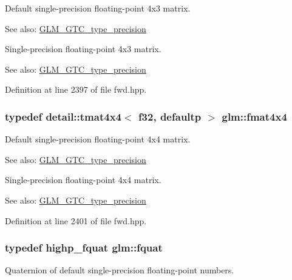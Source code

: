 Default single-precision floating-point 4x3 matrix. \begin{Desc}
\item[See also:]\hyperlink{group__gtc__type__precision}{GLM\_\-GTC\_\-type\_\-precision}\end{Desc}
Single-precision floating-point 4x3 matrix. \begin{Desc}
\item[See also:]\hyperlink{group__gtc__type__precision}{GLM\_\-GTC\_\-type\_\-precision} \end{Desc}


Definition at line 2397 of file fwd.hpp.\hypertarget{group__gtc__type__precision_ga641dae0fcc277f028b4e48e16bbea86}{
\subsubsection[fmat4x4]{\setlength{\rightskip}{0pt plus 5cm}typedef detail::tmat4x4$<$ f32, defaultp $>$ {\bf glm::fmat4x4}}}
\label{group__gtc__type__precision_ga641dae0fcc277f028b4e48e16bbea86}


Default single-precision floating-point 4x4 matrix. \begin{Desc}
\item[See also:]\hyperlink{group__gtc__type__precision}{GLM\_\-GTC\_\-type\_\-precision}\end{Desc}
Single-precision floating-point 4x4 matrix. \begin{Desc}
\item[See also:]\hyperlink{group__gtc__type__precision}{GLM\_\-GTC\_\-type\_\-precision} \end{Desc}


Definition at line 2401 of file fwd.hpp.\hypertarget{group__gtc__type__precision_ga95d73f08018f3864c6ae08dbf1c59f2}{
\subsubsection[fquat]{\setlength{\rightskip}{0pt plus 5cm}typedef highp\_\-fquat {\bf glm::fquat}}}
\label{group__gtc__type__precision_ga95d73f08018f3864c6ae08dbf1c59f2}


Quaternion of default single-precision floating-point numbers.

